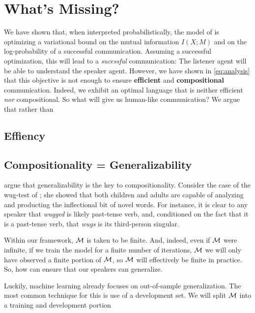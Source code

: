 \documentclass[11pt,a4paper]{article}
\newcommand{\defn}[1]{\textbf{#1}}
\newcommand{\word}[1]{\textit{#1}}
\newcommand{\calM}{{\cal M}}
\begin{document}
\section{What's Missing?}
We have shown that, when interpreted probabilistically, the model
of  is optimizing a variational bound on the mutual information $I(X; M)$ and on the log-probability of a successful communication. Assuming a successful optimization, this will
lead to a \emph{sucessful} communication: The listener agent will
be able to understand the speaker agent. However, we have shown in \cref{eq:analysis} that this objective is not enough to ensure \defn{efficient} and \defn{compositional} communication. Indeed, we exhibit an optimal language that is neither efficient \emph{nor} compositional. 
So what will give us human-like communication? We argue that rather than 

\subsection{Effiency}

\subsection{Compositionality = Generalizability}
 argue that generalizability is the key to compositionality. Consider the case of the wug-test of ; she showed that both children and adults are capable of analyzing and producting the inflectional bit of novel words. For instance, it is clear to any speaker that \word{wugged} is likely past-tense verb, and, conditioned on the fact that it is a past-tense verb, that \word{wugs} is its third-person singular. 

Within our framework, $\calM$ is taken to be finite. And, indeed, even if $\calM$ were infinite, if we train the model for a finite number of iterations, $\calM$ we will only have observed a finite portion of $\calM$, so $\calM$ will effectively be finite in practice. So, how can ensure that our speakers can generalize. 

Luckily, machine learning already focuses on out-of-sample generalization. The most common technique for this is use of a development set. We will split $\calM$ into a training and development portion
\end{document}
